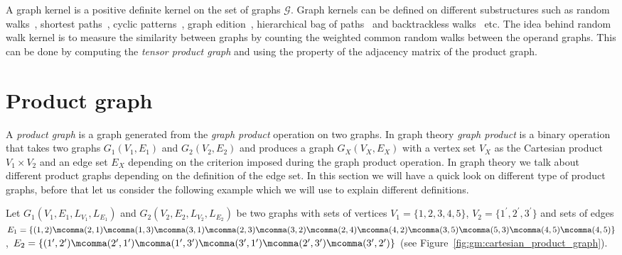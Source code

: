 A graph kernel is a positive definite kernel on the set of graphs $\mathcal{G}$. Graph kernels can be defined on different substructures such as random walks~\cite{Gartner2003a}, shortest paths~\cite{Borgwardt2005}, cyclic patterns~\cite{Horvath2004}, graph edition~\cite{Dupe2009}, hierarchical bag of paths~\cite{Dupe2010} and backtrackless walks~\cite{Aziz2013} etc. The idea behind random walk kernel is to measure the similarity between graphs by counting the weighted common random walks between the operand graphs. This can be done by computing the \emph{tensor product graph} and using the property of the adjacency matrix of the product graph.

\section{Product graph}
\label{sec:gm:pg}
A \emph{product graph} is a graph generated from the \emph{graph product} operation on two graphs. In graph theory \emph{graph product} is a binary operation that takes two graphs $G_1(V_1,E_1)$ and $G_2(V_2,E_2)$ and produces a graph $G_X(V_X,E_X)$ with a vertex set $V_{X}$ as the Cartesian product $V_1\times V_2$ and an edge set $E_{X}$ depending on the criterion imposed during the graph product operation. In graph theory we talk about different product graphs depending on the definition of the edge set. In this section we will have a quick look on different type of product graphs, before that let us consider the following example which we will use to explain different definitions.

Let $G_1(V_1,E_1,L_{V_1},L_{E_1})$ and $G_2(V_2,E_2,L_{V_2},L_{E_2})$ be two graphs with sets of vertices $V_1=\lbrace1,2,3,4,5\rbrace$, $V_2=\lbrace1^\prime,2^\prime,3^\prime\rbrace$ and sets of edges $E_1=\lbrace (1,2)\mcomma(2,1)\mcomma(1,3)\mcomma(3,1)\mcomma(2,3)\mcomma(3,2)\mcomma(2,4)\mcomma(4,2)\mcomma(3,5)\mcomma(5,3) \mcomma(4,5)\mcomma(4,5)\rbrace$, $E_2=\lbrace(1^\prime,2^\prime)\mcomma(2^\prime,1^\prime)\mcomma(1^\prime,3^\prime)\mcomma(3^\prime,1^\prime) \mcomma(2^\prime,3^\prime)\mcomma(3^\prime,2^\prime)\rbrace$ (see Figure~\ref{fig:gm:cartesian_product_graph}).


